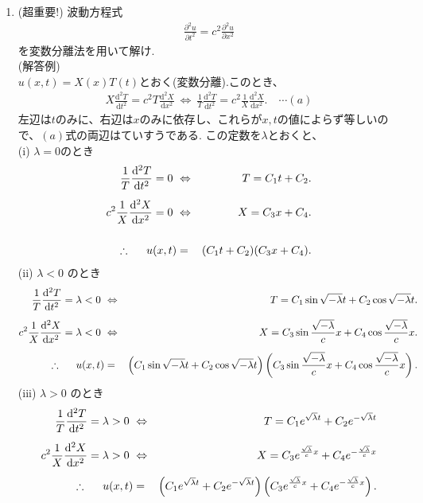 \documentclass[11pt]{jsarticle}
\begin{document}
\begin{enumerate}
\newpage
\item (超重要!) 波動方程式
\begin{eqnarray*}
\frac{\partial^2 u}{\partial t^2}  = c^2 \frac{\partial^2 u}{\partial x^2}
\end{eqnarray*}
を変数分離法を用いて解け.\\
(解答例)\\[8pt]
$u(x,t)=X(x)T(t)$とおく(変数分離).このとき、
%
\begin{eqnarray*}
X\frac{\mathrm{d}^2 T}{\mathrm{d} t^2} =
c^2T \frac{\mathrm{d}^2 X}{\mathrm{d} x^2} \
\Leftrightarrow \ \frac{1}{T}\frac{\mathrm{d}^2 T}{\mathrm{d} t^2}=
c^2 \frac{1}{X}\frac{\mathrm{d}^2 X}{\mathrm{d} x^2}. \quad \cdots (a)
\end{eqnarray*}
%
左辺は$t$のみに、右辺は$x$のみに依存し、これらが$x,t$の値によらず等しいので、$(a)$式の両辺はていすうである.
この定数を$\lambda$とおくと、\\
%
(i) $\lambda=0$のとき
%
\begin{eqnarray*}
\frac{1}{T}\frac{\mathrm{d}^2 T}{\mathrm{d} t^2}  = 0 \ 
&\Leftrightarrow& \ T = C_1t+C_2. \\[5pt]
c^2 \frac{1}{X}\frac{\mathrm{d}^2 X}{\mathrm{d} x^2} = 0 \ 
&\Leftrightarrow& \ X = C_3x+C_4. \\
\\
\therefore \hspace{0.5cm} u(x,t) &=& (C_1t+C_2)(C_3x+C_4).
\end{eqnarray*}
%
(ii) $\lambda<0$ のとき
%
\begin{eqnarray*}
\frac{1}{T}\frac{\mathrm{d}^2 T}{\mathrm{d} t^2} = \lambda<0 \ 
&\Leftrightarrow& \ T = C_1\sin\sqrt{-\lambda}t+C_2\cos\sqrt{-\lambda}t.\\[5pt]
c^2 \frac{1}{X}\frac{\mathrm{d}^2 X}{\mathrm{d} x^2} = \lambda<0 \ 
&\Leftrightarrow& \ X =
C_3\sin\frac{\sqrt{-\lambda}}cx+C_4\cos\frac{\sqrt{-\lambda}}cx.\\[5pt]
\therefore \hspace{0.5cm} u(x,t) &=& 
\left(C_1\sin\sqrt{-\lambda}t+C_2\cos\sqrt{-\lambda}t\right)
\left(C_3\sin\frac{\sqrt{-\lambda}}cx+C_4\cos\frac{\sqrt{-\lambda}}cx\right).
\end{eqnarray*}
%
(iii) $\lambda>0$ のとき
%
\begin{eqnarray*}
\frac{1}{T}\frac{\mathrm{d}^2 T}{\mathrm{d} t^2}  = \lambda>0 \
&\Leftrightarrow& \ T = C_1e^{\sqrt{\lambda}t}+C_2e^{-\sqrt{\lambda}t} \\[5pt]
c^2 \frac{1}{X}\frac{\mathrm{d}^2 X}{\mathrm{d} x^2} = \lambda>0 \
&\Leftrightarrow& \ X = C_3e^{\frac{\sqrt{\lambda}}cx}+
C_4e^{-\frac{\sqrt{\lambda}}cx} \\[5pt]
\therefore \hspace{0.5cm} u(x,t) &=&
\left(C_1e^{\sqrt{\lambda}t}+C_2e^{-\sqrt{\lambda}t}\right)
\left(C_3e^{\frac{\sqrt{\lambda}}cx}+C_4e^{-\frac{\sqrt{\lambda}}cx}\right).
\end{eqnarray*}


\end{enumerate}
\end{document}
